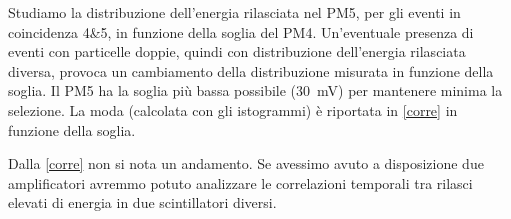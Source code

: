 Studiamo la distribuzione dell'energia rilasciata nel PM5,
per gli eventi in coincidenza 4\&5,
in funzione della soglia del PM4.
Un'eventuale presenza di eventi con particelle doppie,
quindi con distribuzione dell'energia rilasciata diversa,
provoca un cambiamento della distribuzione misurata in funzione della soglia.
Il PM5 ha la soglia più bassa possibile (\SI{30}{mV}) per mantenere minima la selezione.
La moda (calcolata con gli istogrammi) è riportata in \autoref{corre} in funzione della soglia.

Dalla \autoref{corre} non si nota un andamento.
Se avessimo avuto a disposizione due amplificatori
avremmo potuto analizzare le correlazioni temporali tra rilasci elevati di energia in due scintillatori diversi.

